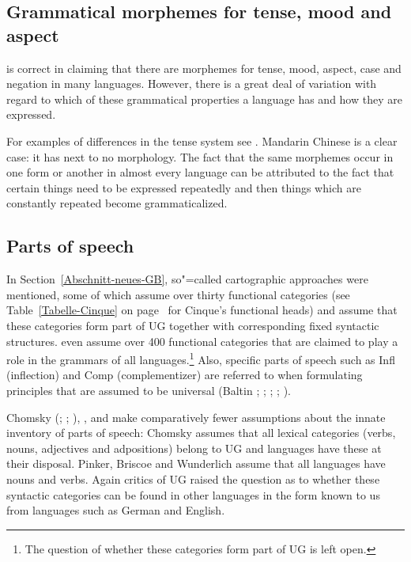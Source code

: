 \subsection{Grammatical morphemes for tense, mood and aspect}

\citet[]{Pinker94a} is correct in claiming that there are morphemes for tense, mood, aspect, case and negation in many languages. However, there is a great
deal of variation with regard to which of these grammatical properties a language has and
how they are expressed.

For examples of differences in the tense system see . Mandarin
Chinese is a clear case: it has next to no morphology. The fact that the same morphemes occur in one form or another in almost every language
can be attributed to the fact that certain things need to be expressed repeatedly and then things which are constantly repeated become grammaticalized.


\subsection{Parts of speech}
\label{Abschnitt-UG-Wortarten}

\addlines
In Section~\ref{Abschnitt-neues-GB}, so"=called cartographic approaches were mentioned, some of which assume over thirty functional categories
(see Table~\ref{Tabelle-Cinque} on page~\pageref{Tabelle-Cinque} for Cinque's functional heads) and assume that these categories form part of UG together with corresponding fixed syntactic structures.
\citet[, 57]{CR2010a} even assume over 400 functional categories
that are claimed to play a role in the grammars of all languages.\footnote{%
	The question of whether these categories form part of UG is left open.
}
Also, specific parts of speech such as \mbox{Infl} (inflection) and
Comp (complementizer) are referred to when formulating principles that are assumed to be universal (Baltin \citeyear[]{Baltin81a}; \citeyear{Baltin2006a}; \citealp{Rizzi82b}; \citealp[]{Chomsky86b};
\citealp[]{Hornstein2013a}). 

Chomsky (\citeyear[]{Chomsky88a-u}; \citeyear{Chomsky91a-u};
\citeyear[]{Chomsky95a-u}), \citet[, 286]{Pinker94a}, \citet[]{Briscoe2000a} and
\citet[]{Wunderlich2004a} make comparatively fewer assumptions about the innate inventory of parts of speech:
Chomsky assumes that all lexical categories (verbs,  nouns,
adjectives and adpositions) belong to UG and languages have these at their disposal.
Pinker, Briscoe and Wunderlich assume that all languages have nouns and verbs.
Again critics of UG raised the question as to whether these syntactic categories can be found in other languages in the form known to us from languages such as German and English.

